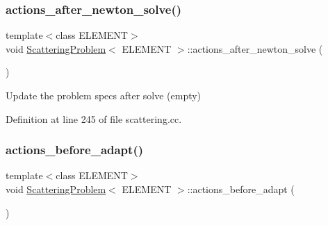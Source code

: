 \mbox{\label{classScatteringProblem_abf1e7b97518c94e12802205dec08b15e}} 
\subsubsection{\texorpdfstring{actions\+\_\+after\+\_\+newton\+\_\+solve()}{actions\_after\_newton\_solve()}\hspace{0.1cm}{\footnotesize\ttfamily [2/2]}}
{\footnotesize\ttfamily template$<$class E\+L\+E\+M\+E\+NT$>$ \\
void \hyperlink{classScatteringProblem}{Scattering\+Problem}$<$ E\+L\+E\+M\+E\+NT $>$\+::actions\+\_\+after\+\_\+newton\+\_\+solve (\begin{DoxyParamCaption}{ }\end{DoxyParamCaption})\hspace{0.3cm}{\ttfamily [inline]}}



Update the problem specs after solve (empty) 



Definition at line 245 of file scattering.\+cc.

\mbox{\label{classScatteringProblem_aca1b756a307f9c1d8a70c7b7e68a296b}} 
\subsubsection{\texorpdfstring{actions\+\_\+before\+\_\+adapt()}{actions\_before\_adapt()}\hspace{0.1cm}{\footnotesize\ttfamily [1/2]}}
{\footnotesize\ttfamily template$<$class E\+L\+E\+M\+E\+NT$>$ \\
void \hyperlink{classScatteringProblem}{Scattering\+Problem}$<$ E\+L\+E\+M\+E\+NT $>$\+::actions\+\_\+before\+\_\+adapt (\begin{DoxyParamCaption}{ }\end{DoxyParamCaption})}



